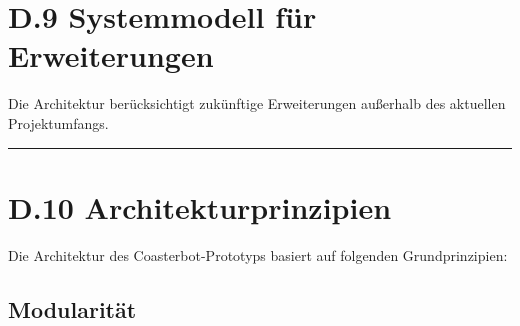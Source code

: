 \documentclass[
  a4paper,
  12pt,
  DIV=12,        %
  parskip=half,  %
  headings=small %
]{scrartcl}
\theoremstyle{definition}
\theoremstyle{definition}
\newenvironment{Shaded}{\begin{snugshade}}{\end{snugshade}}
\begin{document}
\section{D.9 Systemmodell für
Erweiterungen}\label{d.9-systemmodell-fuxfcr-erweiterungen}

Die Architektur berücksichtigt zukünftige Erweiterungen außerhalb des
aktuellen Projektumfangs.

\begin{Shaded}
\begin{Highlighting}[]

\NormalTok{                           |}
\NormalTok{        +{-}{-}{-}{-}{-}{-}{-}{-}{-}{-}{-}{-}{-}{-}{-}{-}{-}{-}+{-}{-}{-}{-}{-}{-}{-}{-}{-}{-}{-}{-}{-}{-}{-}{-}{-}{-}+}
\NormalTok{        |                  |                  |}

\NormalTok{+{-}{-}{-}{-}{-}{-}{-}{-}{-}{-}{-}{-}{-}{-}{-}+  +{-}{-}{-}{-}{-}{-}{-}{-}{-}{-}{-}{-}{-}{-}{-}+  +{-}{-}{-}{-}{-}{-}{-}{-}{-}{-}{-}{-}{-}{-}{-}+}
\NormalTok{+{-}{-}{-}{-}{-}{-}{-}{-}{-}{-}{-}{-}{-}{-}{-}+  +{-}{-}{-}{-}{-}{-}{-}{-}{-}{-}{-}{-}{-}{-}{-}+  +{-}{-}{-}{-}{-}{-}{-}{-}{-}{-}{-}{-}{-}{-}{-}+}

\NormalTok{        |}

\NormalTok{+{-}{-}{-}{-}{-}{-}{-}{-}{-}{-}{-}{-}{-}{-}{-}{-}{-}{-}{-}{-}{-}{-}{-}{-}{-}{-}{-}{-}{-}{-}{-}+}
\NormalTok{+{-}{-}{-}{-}{-}{-}{-}{-}{-}{-}{-}{-}{-}{-}{-}{-}{-}{-}{-}{-}{-}{-}{-}{-}{-}{-}{-}{-}{-}{-}{-}+}
\end{Highlighting}
\end{Shaded}

\begin{center}\rule{0.5\linewidth}{0.5pt}\end{center}

\section{D.10 Architekturprinzipien}\label{d.10-architekturprinzipien}

Die Architektur des Coasterbot-Prototyps basiert auf folgenden
Grundprinzipien:

\subsection{Modularität}\label{modularituxe4t-1}
\end{document}
